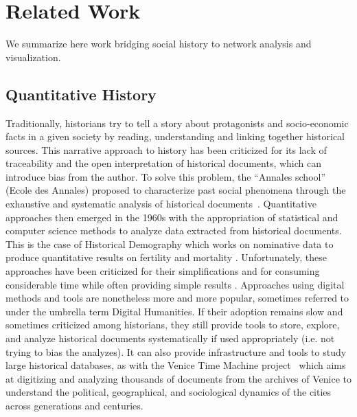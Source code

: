 \section{Related Work}

We summarize here work bridging social history to network analysis and visualization.

\subsection{Quantitative History}

Traditionally, historians try to tell a story about protagonists and socio-economic facts in a given society by reading, understanding and linking together historical sources. This narrative approach to history has been criticized for its lack of traceability and the open interpretation of historical documents, which can introduce bias from the author.
To solve this problem, the ``Annales school'' (Ecole des Annales) proposed to characterize past social phenomena through the exhaustive and systematic analysis of historical documents~\cite{prostDouzeLeconsHistoire2014}.
Quantitative approaches then emerged in the 1960s with the appropriation of statistical and computer science methods to analyze data extracted from historical documents. This is the case of Historical Demography which works on nominative data to produce quantitative results on fertility and mortality \cite{henryRegistresParoissiauxHistoire1956}. Unfortunately, these approaches have been criticized for their simplifications and for consuming considerable time while often providing simple results \cite{karila-cohenNouvellesCuisinesHistoire2018}. Approaches using digital methods and tools are nonetheless more and more popular, sometimes referred to under the umbrella term Digital Humanities. If their adoption remains slow and sometimes criticized among historians, they still provide tools to store, explore, and analyze historical documents systematically if used appropriately (i.e. not trying to bias the analyzes). It can also provide infrastructure and tools to study large historical databases, as with the Venice Time Machine project~\cite{kaplanVeniceTimeMachine2015} which aims at digitizing and analyzing thousands of documents from the archives of Venice to understand the political, geographical, and sociological dynamics of the cities across generations and centuries.


